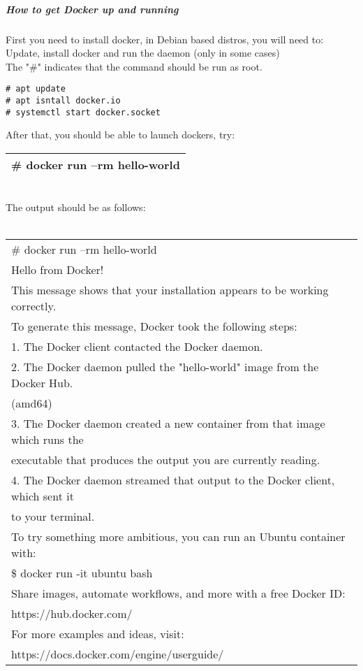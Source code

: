 \documentclass[a4paper,10pt]{article}
\begin{document}
\subparagraph{How to get Docker up and running}
First you need to install docker, in Debian based distros, you will need to:\\
Update, install docker and run the daemon (only in some cases)\\
The "\#" indicates that the command should be run as root.
\begin{verbatim}
# apt update
# apt isntall docker.io
# systemctl start docker.socket
\end{verbatim}
After that, you should be able to launch dockers, try:
\vspace{0.5cm}\\\begin{tabular}{|l|}\hline
\# docker run --rm hello-world
\\\hline\end{tabular}\vspace{0.5cm}\\
The output should be as follows:\\
\vspace{0.5cm}\\\begin{tabular}{|l|}\hline
\# docker run --rm hello-world\\
Hello from Docker!\\
This message shows that your installation appears to be working correctly.\\
To generate this message, Docker took the following steps:\\
 1. The Docker client contacted the Docker daemon.\\
 2. The Docker daemon pulled the "hello-world" image from the Docker Hub.\\
    (amd64)\\
 3. The Docker daemon created a new container from that image which runs the\\
    executable that produces the output you are currently reading.\\
 4. The Docker daemon streamed that output to the Docker client, which sent it\\
    to your terminal.\\
To try something more ambitious, you can run an Ubuntu container with:\\
 \$ docker run -it ubuntu bash\\
Share images, automate workflows, and more with a free Docker ID:\\
 https://hub.docker.com/\\
For more examples and ideas, visit:\\
 https://docs.docker.com/engine/userguide/\\
\hline\end{tabular}\vspace{0.5cm}\\
\end{document}
